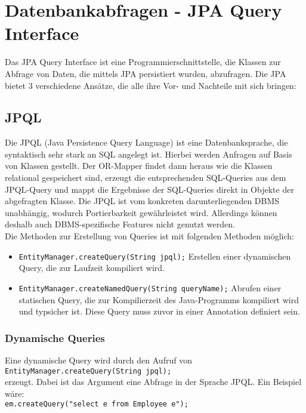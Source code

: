 \section{Datenbankabfragen - JPA Query Interface}

Das JPA Query Interface ist eine Programmierschnittstelle, die Klassen zur Abfrage von Daten, die mittels JPA persistiert wurden, abzufragen. Die JPA bietet 3 verschiedene Ansätze, die alle ihre Vor- und Nachteile mit sich bringen:

\subsection{JPQL}
Die JPQL (Java Persistence Query Language) ist eine Datenbanksprache, die syntaktisch sehr stark an SQL angelegt ist. Hierbei werden Anfragen auf Basis von Klassen gestellt. Der OR-Mapper findet dann heraus wie die Klassen relational gespeichert sind, erzeugt die entsprechenden SQL-Queries aus dem JPQL-Query und mappt die Ergebnisse der SQL-Queries direkt in Objekte der abgefragten Klasse. Die JPQL ist vom konkreten darunterliegenden DBMS unabhängig, wodurch Portierbarkeit gewährleistet wird. Allerdings können deshalb auch DBMS-spezifische Features nicht genutzt werden.\\
Die Methoden zur Erstellung von Queries ist mit folgenden Methoden möglich:
\begin{itemize}
    \item \lstinline{EntityManager.createQuery(String jpql);} Erstellen einer dynamischen Query, die zur Laufzeit kompiliert wird.
    \item \lstinline{EntityManager.createNamedQuery(String queryName);} Abrufen einer statischen Query, die zur Kompilierzeit des Java-Programms kompiliert wird und typsicher ist. Diese Query muss zuvor in einer Annotation definiert sein.
\end{itemize}

\subsubsection{Dynamische Queries}

Eine dynamische Query wird durch den Aufruf von \\
\lstinline{EntityManager.createQuery(String jpql);}\\
erzeugt. Dabei ist das Argument eine Abfrage in der Sprache JPQL. Ein Beispiel wäre:\\

\lstinline{em.createQuery("select e from Employee e");}\\

